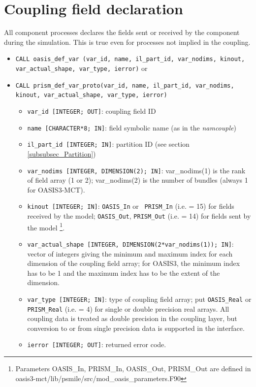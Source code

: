 
\section{Coupling field declaration}
 \label{subsubsec_Declaration}

All component processes declares the fields sent
or received by the component during the simulation. This is
  true even for processes not implied in the coupling. 

\begin{itemize}

\item {\tt CALL oasis\_def\_var       (var\_id, name, il\_part\_id,
  var\_nodims, kinout, \newline var\_actual\_shape, var\_type, ierror)} or

\item {\tt CALL prism\_def\_var\_proto(var\_id, name, il\_part\_id,
  var\_nodims, kinout, var\_actual\_shape, var\_type, ierror)}


\begin{itemize}
 \item {\tt var\_id [INTEGER; OUT]}: coupling field ID
 \item {\tt name [CHARACTER*8; IN]}: field symbolic name (as in the
   {\it namcouple})
 \item {\tt il\_part\_id [INTEGER; IN]}: partition ID (see section \ref{subsubsec_Partition})
 \item {\tt var\_nodims [INTEGER, DIMENSION(2); IN]}: var\_nodims(1) is
   the rank of field array (1 or 2); var\_nodims(2) is the number of
   bundles (always 1 for OASIS3-MCT). 
 \item {\tt kinout [INTEGER; IN]}: {\tt OASIS\_In} or {\tt
   PRISM\_In} (i.e. = 15) for fields received by
   the model; {\tt OASIS\_Out}, {\tt PRISM\_Out} (i.e. = 14) for
   fields sent by the model
\footnote{Parameters OASIS\_In,
   PRISM\_In, OASIS\_Out, PRISM\_Out are defined in oasis3-mct/lib/psmile/src/mod\_oasis\_parameters.F90}.
 \item {\tt var\_actual\_shape [INTEGER, DIMENSION(2*var\_nodims(1)); IN]}: 
   vector of integers giving the minimum and maximum index for each
   dimension of the coupling field array; for OASIS3, the minimum
   index has to be 1 and the maximum index has to be the extent of the
   dimension.
 \item {\tt var\_type [INTEGER; IN]}: type of coupling field array;
   put {\tt OASIS\_Real} or {\tt PRISM\_Real} (i.e. = 4) for single or double precision real
   arrays.  All coupling data is treated as double precision in the
   coupling layer, but conversion to or from single precision data
   is supported in the interface.
 \item {\tt ierror [INTEGER; OUT]}: returned error code. 
\end{itemize}
\end{itemize}

